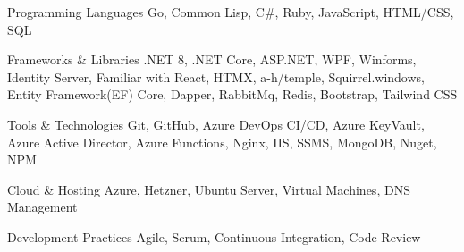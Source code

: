 
\begin{cvskills}

  \cvskill
    {Programming Languages} %
    {Go, Common Lisp, C\#, Ruby, JavaScript, HTML/CSS, SQL} %

  \cvskill
    {Frameworks \& Libraries} %
    {.NET 8, .NET Core, ASP.NET, WPF, Winforms, Identity Server, Familiar with React, HTMX, a-h/temple,
    Squirrel.windows, Entity Framework(EF) Core, Dapper, RabbitMq, Redis, Bootstrap, Tailwind CSS} %

  \cvskill
    {Tools \& Technologies} %
    {Git, GitHub, Azure DevOps CI/CD, Azure KeyVault, Azure Active Director, Azure Functions, Nginx, IIS, SSMS, MongoDB, Nuget, NPM} %

  \cvskill
    {Cloud \& Hosting} %
    {Azure, Hetzner, Ubuntu Server, Virtual Machines, DNS Management} %

  \cvskill
    {Development Practices} %
    {Agile, Scrum, Continuous Integration, Code Review} %

\end{cvskills}